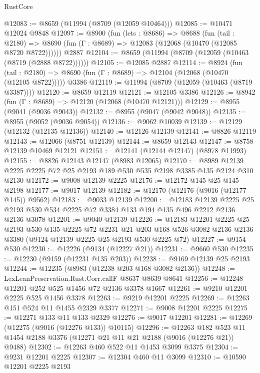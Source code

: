 \begin{lexlean}{RustCore}
\begin{coremodule}
@12083 := @8659 (@11994 (@8709 (@12059 @10464)))
@12085 := @10471 @12024 @9848
@12097 := @8900
    (fun (lets : @8686) =>
    @8688
      (fun (tail : @2180) =>
      @8690 (fun (Γ : @8689) => @12083 (@12068 (@10470 (@12085 @8720 @8722))))))
    @2887
@12104 := @8659 (@11994 (@8709 (@12059 (@10463 (@8719 (@2888 @8722))))))
@12105 := @12085 @2887
@12114 := @8924
    (fun (tail : @2180) => @8690 (fun (Γ : @8689) => @12104 (@12068 (@10470 (@12105 @8722)))))
    @3386
@12119 := @11994 (@8709 (@12059 (@10463 (@8719 @3387))))
@12120 := @8659 @12119
@12121 := @12105 @3386
@12126 := @8942 (fun (Γ : @8689) => @12120 (@12068 (@10470 @12121)))
@12129 := @8955 (@9041 (@9036 @9043))
@12132 := @8955 (@9047 (@9042 @9048))
@12135 := @8955 (@9052 (@9036 @9054))
@12136 := @9062 @10039
@12139 := @12129 (@12132 (@12135 @12136))
@12140 := @12126 @12139
@12141 := @8826 @12119
@12143 := @12066 (@8751 @12139)
@12144 := @8659 @12143
@12147 := @8758 @12139 @10469 @12121
@12151 := @12141 (@12144 @12147) (@8978 @11993)
@12155 := @8826 @12143 @12147 (@8983 @12065)
@12170 := @8989 @12139 @2225 @2225 @72 @25 @2193 @189 @530 @535 @2198 @3385 @135 @2124 @310 @2130
@12172 := @9008 @12139 @2225
@12176 := @12172 @145 @25 @145 @2198
@12177 := @9017 @12139
@12182 := @12170 (@12176 (@9016 (@12177 @145)) @9562)
@12183 := @9033 @12139
@12200 := @12183
    @12139
    @2225
    @25
    @2193
    @530
    @534
    @2225
    @72
    @3384
    @133
    @194
    @135
    @496
    @2212
    @2136
    @2136
    @3078
@12201 := @9040 @12139
@12226 := @12183
    @12201
    @2225
    @25
    @2193
    @530
    @135
    @2225
    @72
    @2231
    @21
    @203
    @168
    @526
    @3082
    @2136
    @2136
    @3380
    (@9124 @12139 @2225 @25 @2193 @530 @2225 @72)
@12227 := @9154 @530
@12230 := @12226 (@9134 (@12227 @21))
@12231 := @9660 @530
@12235 := @12230 (@9159 (@12231 @135 @203))
@12238 := @9169 @12139 @25 @2193
@12244 := @12235 (@8983 (@12238 @203 @168 @3082 @2136))
@12248 := LexLeanPreservation.Rust.Corr.callF @8637 @8639 @8641
@12256 := @12248 @12201 @252 @525 @1456 @72 @2136 @3378 @1667
@12261 := @9210 @12201 @2225 @525 @1456 @3378
@12263 := @9219 @12201 @2225
@12269 := @12263 @151 @524 @11 @1455 @2329 @3377
@12271 := @9008 @12201 @2225
@12275 := @12271 @133 @11 @133 @2329
@12276 := @9017 @12201
@12281 := @12269 (@12275 (@9016 (@12276 @133)) @10115)
@12296 := @12263
    @182
    @523
    @11
    @1454
    @2188
    @3376
    (@12271 @21 @11 @21 @2188 (@9016 (@12276 @21)) @9488)
@12302 := @12263 @460 @522 @11 @1453 @3099 @3375
@12304 := @9231 @12201 @2225
@12307 := @12304 @460 @11 @3099
@12310 := @10590 @12201 @2225 @2193

\end{coremodule}
\end{lexlean}
